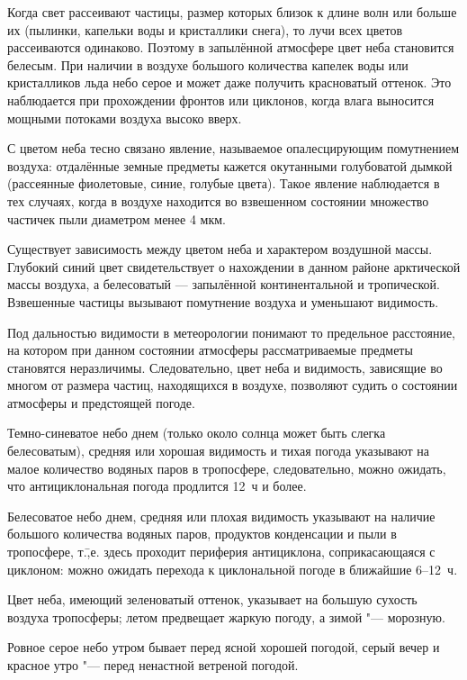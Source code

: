 Когда свет рассеивают частицы, размер которых близок к длине волн или
больше их (пылинки, капельки воды и кристаллики снега), то лучи всех
цветов рассеиваются одинаково. Поэтому в запылённой атмосфере цвет
неба становится белесым. При наличии в воздухе большого количества
капелек воды или кристалликов льда небо серое и может даже получить
красноватый оттенок. Это наблюдается при прохождении фронтов или
циклонов, когда влага выносится мощными потоками воздуха высоко вверх.

С цветом неба тесно связано явление, называемое опалесцирующим
помутнением воздуха: отдалённые земные предметы кажется окутанными
голубоватой дымкой (рассеянные фиолетовые, синие, голубые
цвета). Такое явление наблюдается в тех случаях, когда в воздухе
находится во взвешенном состоянии множество частичек пыли диаметром
менее 4 мкм.

Существует зависимость между цветом неба и характером воздушной
массы. Глубокий синий цвет свидетельствует о нахождении в данном
районе арктической массы воздуха, а белесоватый — запылённой
континентальной и тропической. Взвешенные частицы вызывают помутнение
воздуха и уменьшают видимость.

Под дальностью видимости в метеорологии понимают то предельное
расстояние, на котором при данном состоянии атмосферы рассматриваемые
предметы становятся неразличимы. Следовательно, цвет неба и видимость,
зависящие во многом от размера частиц, находящихся в воздухе,
позволяют судить о состоянии атмосферы и предстоящей погоде.

 Темно-синеватое небо днем (только около солнца может быть
слегка белесоватым), средняя или хорошая видимость и тихая погода
указывают на малое количество водяных паров в тропосфере,
следовательно, можно ожидать, что антициклональная погода продлится
12~ч и более.

 Белесоватое небо днем, средняя или плохая видимость указывают
на наличие большого количества водяных паров, продуктов конденсации и
пыли в тропосфере, т.\=,е. здесь проходит периферия антициклона,
соприкасающаяся с циклоном: можно ожидать перехода к циклональной
погоде в ближайшие 6--12~ч.

 Цвет неба, имеющий зеленоватый оттенок, указывает на большую
сухость воздуха тропосферы; летом предвещает жаркую погоду, а зимой "---
морозную.

 Ровное серое небо утром бывает перед ясной хорошей погодой,
серый вечер и красное утро "--- перед ненастной ветреной погодой.

